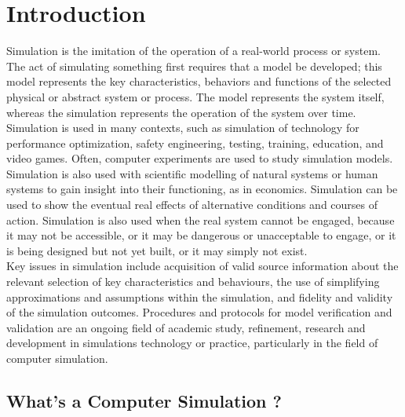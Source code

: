 \documentclass[12pt]{report}
\begin{document}
\section{Introduction}
Simulation is the imitation of the operation of a real-world process or system. The act of simulating something first requires that a model be developed; this model represents the key characteristics, behaviors and functions of the selected physical or abstract system or process. The model represents the system itself, whereas the simulation represents the operation of the system over time.
\\
Simulation is used in many contexts, such as simulation of technology for performance optimization, safety engineering, testing, training, education, and video games. Often, computer experiments are used to study simulation models. Simulation is also used with scientific modelling of natural systems or human systems to gain insight into their functioning, as in economics. Simulation can be used to show the eventual real effects of alternative conditions and courses of action. Simulation is also used when the real system cannot be engaged, because it may not be accessible, or it may be dangerous or unacceptable to engage, or it is being designed but not yet built, or it may simply not exist.
\\
Key issues in simulation include acquisition of valid source information about the relevant selection of key characteristics and behaviours, the use of simplifying approximations and assumptions within the simulation, and fidelity and validity of the simulation outcomes. Procedures and protocols for model verification and validation are an ongoing field of academic study, refinement, research and development in simulations technology or practice, particularly in the field of computer simulation.

\subsection{What's a Computer Simulation ?}
\end{document}
